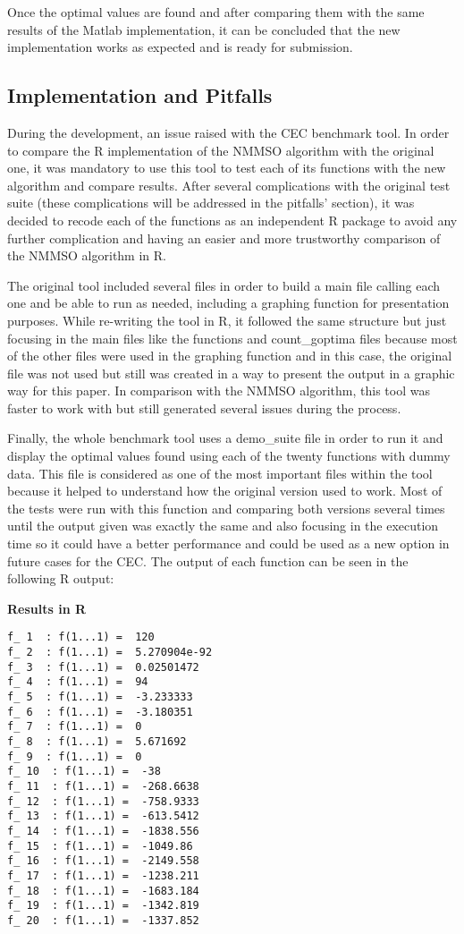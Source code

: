 \documentclass[12pt,a4paper]{article}
\begin{document}
Once the optimal values are found and after comparing them with the same
results of the Matlab implementation, it can be concluded that the new
implementation works as expected and is ready for submission.

\subsection{Implementation and
Pitfalls}\label{implementation-and-pitfalls}

During the development, an issue raised with the CEC benchmark tool. In
order to compare the R implementation of the NMMSO algorithm with the
original one, it was mandatory to use this tool to test each of its
functions with the new algorithm and compare results. After several
complications with the original test suite (these complications will be
addressed in the pitfalls' section), it was decided to recode each of
the functions as an independent R package to avoid any further
complication and having an easier and more trustworthy comparison of the
NMMSO algorithm in R.

The original tool included several files in order to build a main file
calling each one and be able to run as needed, including a graphing
function for presentation purposes. While re-writing the tool in R, it
followed the same structure but just focusing in the main files like the
functions and count\_goptima files because most of the other files were
used in the graphing function and in this case, the original file was
not used but still was created in a way to present the output in a
graphic way for this paper. In comparison with the NMMSO algorithm, this
tool was faster to work with but still generated several issues during
the process.

Finally, the whole benchmark tool uses a demo\_suite file in order to
run it and display the optimal values found using each of the twenty
functions with dummy data. This file is considered as one of the most
important files within the tool because it helped to understand how the
original version used to work. Most of the tests were run with this
function and comparing both versions several times until the output
given was exactly the same and also focusing in the execution time so it
could have a better performance and could be used as a new option in
future cases for the CEC. The output of each function can be seen in the
following R output:

\textbf{Results in R}

\begin{verbatim}
f_ 1  : f(1...1) =  120 
f_ 2  : f(1...1) =  5.270904e-92 
f_ 3  : f(1...1) =  0.02501472 
f_ 4  : f(1...1) =  94 
f_ 5  : f(1...1) =  -3.233333 
f_ 6  : f(1...1) =  -3.180351 
f_ 7  : f(1...1) =  0 
f_ 8  : f(1...1) =  5.671692 
f_ 9  : f(1...1) =  0 
f_ 10  : f(1...1) =  -38 
f_ 11  : f(1...1) =  -268.6638 
f_ 12  : f(1...1) =  -758.9333 
f_ 13  : f(1...1) =  -613.5412 
f_ 14  : f(1...1) =  -1838.556 
f_ 15  : f(1...1) =  -1049.86 
f_ 16  : f(1...1) =  -2149.558 
f_ 17  : f(1...1) =  -1238.211 
f_ 18  : f(1...1) =  -1683.184 
f_ 19  : f(1...1) =  -1342.819 
f_ 20  : f(1...1) =  -1337.852 
\end{verbatim}
\end{document}
